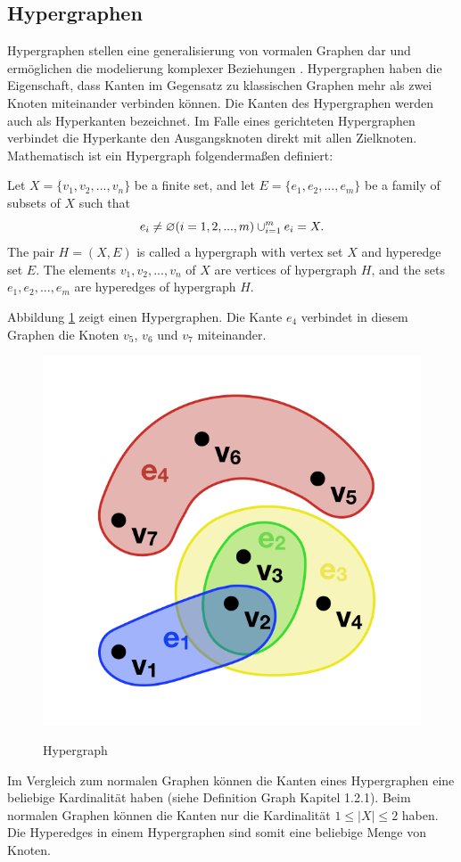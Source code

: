 \subsection{Hypergraphen}
Hypergraphen stellen eine generalisierung von vormalen Graphen dar und ermöglichen die modelierung komplexer Beziehungen \cite{anglesintro}.
Hypergraphen haben die Eigenschaft, dass Kanten im Gegensatz zu klassischen Graphen mehr als zwei Knoten miteinander verbinden können.
Die Kanten des Hypergraphen werden auch als Hyperkanten bezeichnet.
Im Falle eines gerichteten Hypergraphen verbindet die Hyperkante den Ausgangsknoten direkt mit allen Zielknoten.
\\Mathematisch ist ein Hypergraph folgendermaßen definiert:
\begin{definition}
	Let $X=\{v_{1}, v_{2},...,v_{n}\}$ be a finite set,
	and let $E=\{e_{1},e_{2},...,e_{m}\}$ be a family of subsets of $X$ such that
	\[e_{i} \neq \varnothing (i=1,2,...,m) \\
	\cup_{i=1}^{m}e_{i}=X.
	\]
	The pair $H=(X,E)$ is called a hypergraph with vertex set $X$
	and hyperedge set $E$. The elements $v_{1}, v_{2},...,v_{n}$ of $X$ are vertices
	of hypergraph $H$, and the sets $e_{1}, e_{2},...,e_{m}$ are hyperedges of hypergraph $H$.\cite[Seite 2]{zhang2018hypergraph}
\end{definition}
Abbildung \ref{fig:hyper} zeigt einen Hypergraphen.
Die Kante $e_{4}$ verbindet in diesem Graphen die Knoten $v_{5}$, $v_{6}$ und $v_{7}$ miteinander.
\begin{figure}[H]
\begin{center}
	\includegraphics[scale = 0.5]{./images/Hypergraph2.png}
	\label{fig:hyper}
	\caption{Hypergraph}
\end{center}
\end{figure}
Im Vergleich zum normalen Graphen können die Kanten eines Hypergraphen eine beliebige Kardinalität haben (siehe Definition Graph Kapitel 1.2.1).
Beim normalen Graphen können die Kanten nur die Kardinalität $1 \leq |X| \leq 2$ haben.
Die Hyperedges in einem Hypergraphen sind somit eine beliebige Menge von Knoten.


